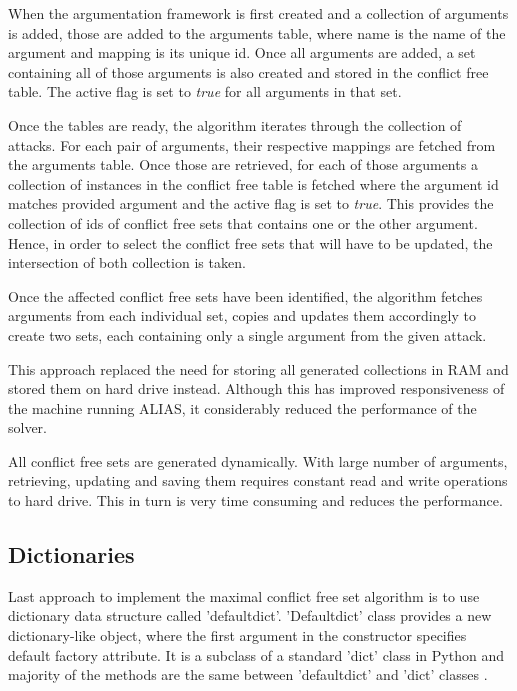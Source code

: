 When the argumentation framework is first created and a collection of arguments is added, those are added to the arguments table, where name is the name of the argument and mapping is its unique id. Once all arguments are added, a set containing all of those arguments is also created and stored in the conflict free table. The active flag is set to \textit{true} for all arguments in that set.

Once the tables are ready, the algorithm iterates through the collection of attacks. For each pair of arguments, their respective mappings are fetched from the arguments table. Once those are retrieved, for each of those arguments a collection of instances in the conflict free table is fetched where the argument id matches provided argument and the active flag is set to \textit{true}. This provides the collection of ids of conflict free sets that contains one or the other argument. Hence, in order to select the conflict free sets that will have to be updated, the intersection of both collection is taken.

Once the affected conflict free sets have been identified, the algorithm fetches arguments from each individual set, copies and updates them accordingly to create two sets, each containing only a single argument from the given attack.

This approach replaced the need for storing all generated collections in RAM and stored them on hard drive instead. Although this has improved responsiveness of the machine running ALIAS, it considerably reduced the performance of the solver. 

All conflict free sets are generated dynamically. With large number of arguments, retrieving, updating and saving them requires constant read and write operations to hard drive. This in turn is very time consuming and reduces the performance.

\subsection{Dictionaries}\label{sec:dicts}
Last approach to implement the maximal conflict free set algorithm is to use dictionary data structure called 'defaultdict'. 'Defaultdict' class provides a new dictionary-like object, where the first argument in the constructor specifies default factory attribute. It is a subclass of a standard 'dict' class in Python and majority of the methods are the same between 'defaultdict' and 'dict' classes \citep{defaultdict}.

